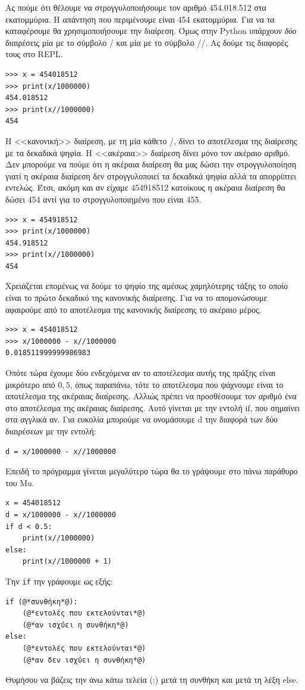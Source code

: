 \documentclass[b5paper,11pt,twoside,openleft]{memoir}
\begin{document}
Ας πούμε ότι θέλουμε να στρογγυλοποιήσουμε τον αριθμό 454.018.512 στα εκατομμύρια. Η απάντηση που περιμένουμε είναι 454 εκατομμύρια.
Για να τα καταφέρουμε θα χρησιμοποιήσουμε την διαίρεση. Όμως στην Python υπάρχουν \emph{δύο} διαιρέσεις μία με το σύμβολο / και μία με το σύμβολο //. Ας δούμε τις διαφορές τους στο REPL.
\begin{lstlisting}
>>> x = 454018512
>>> print(x/1000000)
454.018512
>>> print(x//1000000)
454
\end{lstlisting}
Η <<κανονική>> διαίρεση, με τη μία κάθετο /, δίνει το αποτέλεσμα της διαίρεσης με τα δεκαδικά ψηφία. Η <<ακέραια>> διαίρεση δίνει μόνο τον ακέραιο αριθμό. Δεν μπορούμε να πούμε ότι η ακέραια διαίρεση θα μας δώσει την στρογγυλοποίηση γιατί η ακέραια διαίρεση δεν στρογγυλοποιεί τα δεκαδικά ψηφία αλλά τα απορρίπτει εντελώς. Έτσι, ακόμη και αν είχαμε 454918512 κατοίκους η ακέραια διαίρεση θα δώσει 454 αντί για το στρογγυλοποιημένο που είναι 455.
\begin{lstlisting}
>>> x = 454918512
>>> print(x/1000000)
454.918512
>>> print(x//1000000)
454
\end{lstlisting}

Χρειάζεται επομένως να δούμε το ψηφίο της αμέσως χαμηλότερης τάξης το οποίο είναι το πρώτο δεκαδικό της κανονικής διαίρεσης. Για να το απομονώσουμε αφαιρούμε από το αποτέλεσμα της κανονικής διαίρεσης το ακέραιο μέρος.
\begin{lstlisting}
>>> x = 454018512
>>> x/1000000 - x//1000000
0.018511999999986983
\end{lstlisting}
Οπότε τώρα έχουμε δύο ενδεχόμενα αν το αποτέλεσμα αυτής της πράξης είναι μικρότερο από $0,5$, όπως παραπάνω, τότε το αποτέλεσμα που ψάχνουμε είναι το αποτέλεσμα της ακέραιας διαίρεσης. Αλλιώς πρέπει να προσθέσουμε τον αριθμό ένα στο αποτέλεσμα της ακέραιας διαίρεσης.
Αυτό γίνεται με την εντολή if, που σημαίνει στα αγγλικά αν. Για ευκολία μπορούμε να ονομάσουμε d την διαφορά των δύο διαιρέσεων με την εντολή:
\begin{lstlisting}
d = x/1000000 - x//1000000
\end{lstlisting}
Επειδή το πρόγραμμα γίνεται μεγαλύτερο τώρα θα το γράψουμε στο πάνω παράθυρο του Mu.
\begin{lstlisting}
x = 454018512
d = x/1000000 - x//1000000
if d < 0.5:
    print(x//1000000)
else:
    print(x//1000000 + 1)
\end{lstlisting}
Την \lstinline{if} την γράφουμε ως εξής:
\begin{lstlisting}
if (@*συνθήκη*@):
    (@*εντολές που εκτελούνται*@)
    (@*αν ισχύει η συνθήκη*@)
else:
    (@*εντολές που εκτελούνται*@)
    (@*αν δεν ισχύει η συνθήκη*@)
\end{lstlisting}
Θυμήσου να βάζεις την άνω κάτω τελεία (:) μετά τη συνθήκη και μετά τη λέξη else.
\end{document}

